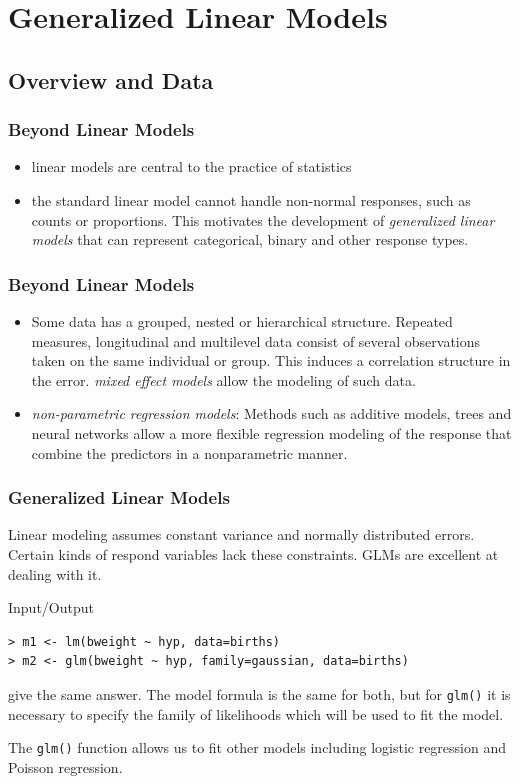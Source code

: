 \section{Generalized Linear Models}
\subsection{Overview and Data}
\begin{frame}\frametitle{Beyond Linear Models}
  \begin{itemize}
  \item linear models are central to the practice of statistics
  \item the standard linear model cannot handle non-normal responses, such as counts or proportions. This motivates the development of
\textit{generalized linear models} that can represent categorical, binary and other response types.
  \end{itemize}
\end{frame}

\begin{frame}\frametitle{Beyond Linear Models}
  \begin{itemize}
  \item Some data has a grouped, nested or hierarchical structure. Repeated measures, longitudinal and multilevel data consist of several observations taken
on the same individual or group. This induces a correlation structure in the error. \textit{mixed effect models} allow the modeling of such data.
  \item \textit{non-parametric regression models}: Methods such as additive models, trees and neural networks allow a more flexible regression
modeling of the response that combine the predictors in a nonparametric manner.
  \end{itemize}
\end{frame}

\begin{frame}[fragile]\frametitle{Generalized Linear Models}
Linear modeling assumes constant variance and normally distributed errors. Certain kinds of respond variables lack these constraints. GLMs are excellent at dealing with it.
\begin{exampleblock}{Input/Output}\small
\begin{verbatim}
> m1 <- lm(bweight ~ hyp, data=births)
> m2 <- glm(bweight ~ hyp, family=gaussian, data=births)
\end{verbatim}
\end{exampleblock}
give the same answer. The model formula is the same for both, but for \texttt{glm()} it is necessary to specify the family of likelihoods which will be used to fit the model. 

The \texttt{glm()} function allows us to fit other models including logistic regression and Poisson regression.
\end{frame}

